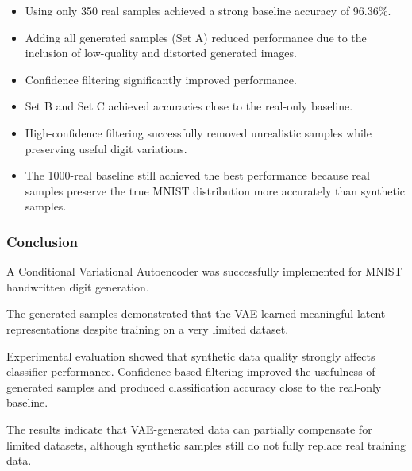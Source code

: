 \begin{itemize}

\item Using only 350 real samples achieved a strong baseline accuracy of 96.36\%.

\item Adding all generated samples (Set A) reduced performance due to the inclusion of low-quality and distorted generated images.

\item Confidence filtering significantly improved performance.

\item Set B and Set C achieved accuracies close to the real-only baseline.

\item High-confidence filtering successfully removed unrealistic samples while preserving useful digit variations.

\item The 1000-real baseline still achieved the best performance because real samples preserve the true MNIST distribution more accurately than synthetic samples.

\end{itemize}

\subsubsection{Conclusion}

A Conditional Variational Autoencoder was successfully implemented for MNIST handwritten digit generation.

The generated samples demonstrated that the VAE learned meaningful latent representations despite training on a very limited dataset.

Experimental evaluation showed that synthetic data quality strongly affects classifier performance. Confidence-based filtering improved the usefulness of generated samples and produced classification accuracy close to the real-only baseline.

The results indicate that VAE-generated data can partially compensate for limited datasets, although synthetic samples still do not fully replace real training data.

\endgroup